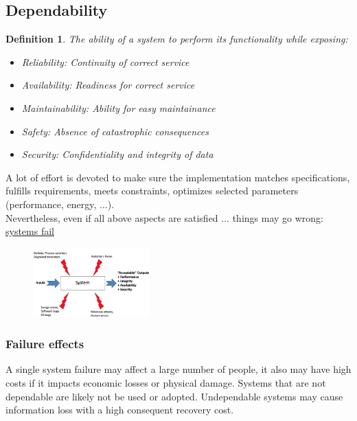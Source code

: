 \documentclass[10pt, oneside]{article}
\newtheorem{defn}{Definition}
\begin{document}
\subsection{Dependability}
\begin{defn}
    The ability of a system to perform its functionality while exposing:\begin{itemize}
        \item Reliability: Continuity of correct service
        \item Availability: Readiness for correct service
        \item Maintainability: Ability for easy maintainance 
        \item Safety: Absence of catastrophic consequences
        \item Security: Confidentiality and integrity of data
    \end{itemize}
\end{defn}
A lot of effort is devoted to make sure the implementation matches specifications, fulfills requirements, meets constraints, optimizes selected parameters (performance, energy, ...).\\Nevertheless, even if all above aspects are satisfied ... things may go wrong: \underline{systems fail}
\begin{figure}[H]
    \begin{center}
    \includegraphics[width=0.4\textwidth]{img/img91.png}
    \end{center}
\end{figure}
\subsubsection{Failure effects}
A single system failure may affect a large number of people, it also may have high costs if it impacts economic losses or physical damage. Systems that are not dependable are likely not be used or adopted. Undependable systems may cause information loss with a high consequent recovery cost.
\end{document}

